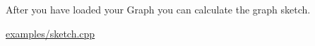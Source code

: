 After you have loaded your Graph you can calculate the graph sketch.

\hyperlink{examples_2sketch_8cpp-example}{examples/sketch.\+cpp} 